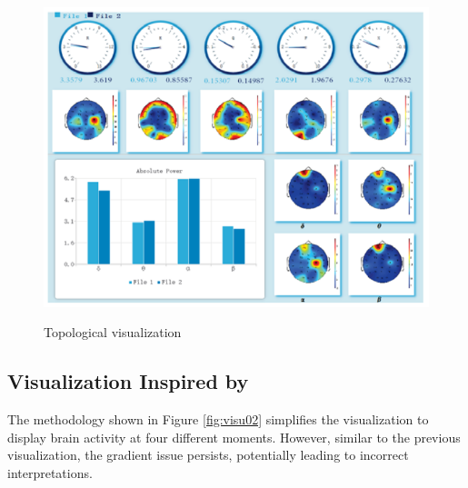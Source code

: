 \documentclass[format=sigconf]{acmart}
\begin{document}
			\begin{figure}[h]
				\centering
				\caption{Topological visualization}
				\includegraphics[width=\linewidth]{../presentation/images/visu01}
				\label{fig:visu01}
			\end{figure}
	
		\subsection{Visualization Inspired by \cite{8937083}}
			\par The methodology shown in Figure \ref{fig:visu02} simplifies the visualization to display brain activity at four different moments. However, similar to the previous visualization, the gradient issue persists, potentially leading to incorrect interpretations.
			
\end{document}
